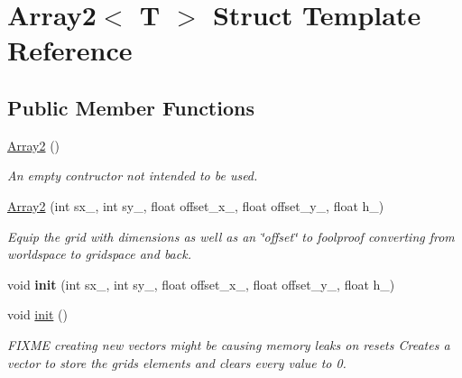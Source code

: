\hypertarget{structArray2}{}\section{Array2$<$ T $>$ Struct Template Reference}
\label{structArray2}
\subsection*{Public Member Functions}
\begin{DoxyCompactItemize}
\item 
\mbox{\label{structArray2_a42645581bcf87a47ecf3263388809112}} 
\mbox{\hyperlink{structArray2_a42645581bcf87a47ecf3263388809112}{Array2}} ()
\begin{DoxyCompactList}\small\item\em An empty contructor not intended to be used. \end{DoxyCompactList}\item 
\mbox{\label{structArray2_ab4f4080a8318cfa7c953ae1ffb560daa}} 
\mbox{\hyperlink{structArray2_ab4f4080a8318cfa7c953ae1ffb560daa}{Array2}} (int sx\+\_\+, int sy\+\_\+, float offset\+\_\+x\+\_\+, float offset\+\_\+y\+\_\+, float h\+\_\+)
\begin{DoxyCompactList}\small\item\em Equip the grid with dimensions as well as an \char`\"{}offset\char`\"{} to foolproof converting from worldspace to gridspace and back. \end{DoxyCompactList}\item 
\mbox{\label{structArray2_a7a7631efac6def77a33405808add9842}} 
void {\bfseries init} (int sx\+\_\+, int sy\+\_\+, float offset\+\_\+x\+\_\+, float offset\+\_\+y\+\_\+, float h\+\_\+)
\item 
\mbox{\label{structArray2_ad6a742ce7bd22f8f56b3959a26f28c11}} 
void \mbox{\hyperlink{structArray2_ad6a742ce7bd22f8f56b3959a26f28c11}{init}} ()
\begin{DoxyCompactList}\small\item\em F\+I\+X\+ME creating new vectors might be causing memory leaks on resets Creates a vector to store the grid\textquotesingle{}s elements and clears every value to 0. \end{DoxyCompactList}\item 

\end{DoxyCompactItemize}
